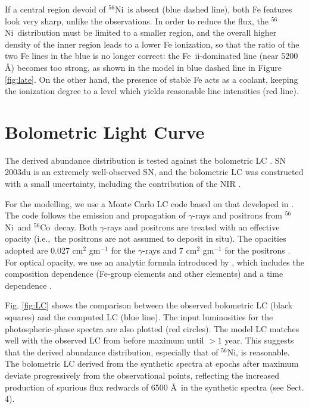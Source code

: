 \documentclass[usegraphicx,usenatbib]{mn2e}
\newcommand{\ie}{i.e.,\ }
\newcommand{\FeII}{Fe~{\sc ii}}
\newcommand{\Cofs}{$^{56}$Co}
\newcommand{\Nifs}{$^{56}$Ni}
\begin{document}
If a central region devoid of \Nifs\ is absent (blue dashed line), both Fe
features look very sharp, unlike the observations. In order to reduce the flux,
the \Nifs\ distribution must be limited to a smaller region, and the overall
higher density of the inner region leads to a lower Fe ionization, so that the
ratio of the two Fe lines in the blue is no longer correct: the \FeII-dominated
line (near 5200 \AA) becomes too strong, as shown in the model in blue dashed
line in Figure \ref{fig:late}. On the other hand, the presence of stable Fe acts
as a coolant, keeping the ionization degree to a level which yields reasonable
line intensities (red line).


\section{Bolometric Light Curve}
\label{sec:LC}

The derived abundance distribution is tested against the bolometric LC
\citep{stanishev07}. SN 2003du is an extremely well-observed SN, and the
bolometric LC was constructed with a small uncertainty, including the
contribution of the NIR \citep{stanishev07}.

For the modelling, we use a Monte Carlo LC code based on that developed in 
\citet{cappellaro97}. 
The code follows the emission and propagation of
$\gamma$-rays and positrons from \Nifs\ and \Cofs\ decay. Both $\gamma$-rays and
positrons are treated with an effective opacity (\ie the positrons are not
assumed to deposit in situ). The opacities adopted are 0.027 cm$^2$ gm$^{-1}$
for the $\gamma$-rays and 7 cm$^2$ gm$^{-1}$ for the positrons
\citep{axelrod80}.
For optical opacity, we use an analytic formula introduced 
by \citet{mazzali01Ia,mazzali07Ia}, which includes the composition dependence
(Fe-group elements and other elements) and a time dependence
\citep{hoeflich96Ia}.

Fig. \ref{fig:LC} shows the comparison between the observed bolometric LC (black
squares) and the computed LC (blue line). The input luminosities for the
photospheric-phase spectra are also  plotted (red circles). The model LC matches
well with the observed LC from before maximum until $> 1$ year. This suggests
that the derived abundance distribution, especially that of \Nifs, is
reasonable. The bolometric LC derived from the synthetic spectra at epochs after
maximum deviate progressively from the observational points, reflecting the
increased production of spurious flux redwards of 6500 \AA\ in the synthetic
spectra (see Sect. 4). 
\end{document}
